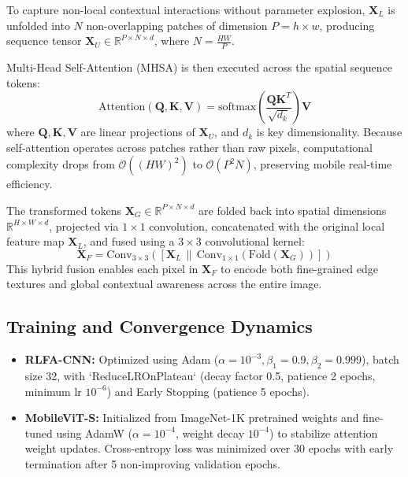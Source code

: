 \documentclass[conference]{IEEEtran}
\begin{document}
To capture non-local contextual interactions without parameter explosion, $\mathbf{X}_L$ is unfolded into $N$ non-overlapping patches of dimension $P = h \times w$, producing sequence tensor $\mathbf{X}_U \in \mathbb{R}^{P \times N \times d}$, where $N = \frac{HW}{P}$.

Multi-Head Self-Attention (MHSA) is then executed across the spatial sequence tokens:
\begin{equation}
\text{Attention}(\mathbf{Q}, \mathbf{K}, \mathbf{V}) = \text{softmax}\left(\frac{\mathbf{Q}\mathbf{K}^T}{\sqrt{d_k}}\right)\mathbf{V}
\end{equation}
where $\mathbf{Q}, \mathbf{K}, \mathbf{V}$ are linear projections of $\mathbf{X}_U$, and $d_k$ is key dimensionality. Because self-attention operates across patches rather than raw pixels, computational complexity drops from $\mathcal{O}((HW)^2)$ to $\mathcal{O}(P^2 N)$, preserving mobile real-time efficiency.

The transformed tokens $\mathbf{X}_G \in \mathbb{R}^{P \times N \times d}$ are folded back into spatial dimensions $\mathbb{R}^{H \times W \times d}$, projected via $1 \times 1$ convolution, concatenated with the original local feature map $\mathbf{X}_L$, and fused using a $3 \times 3$ convolutional kernel:
\begin{equation}
\mathbf{X}_F = \text{Conv}_{3\times3}\left(\left[\mathbf{X}_L \,\|\, \text{Conv}_{1\times1}(\text{Fold}(\mathbf{X}_G))\right]\right)
\end{equation}
This hybrid fusion enables each pixel in $\mathbf{X}_F$ to encode both fine-grained edge textures and global contextual awareness across the entire image.

\subsection{Training and Convergence Dynamics}
\begin{itemize}
    \item \textbf{RLFA-CNN:} Optimized using Adam ($\alpha = 10^{-3}, \beta_1 = 0.9, \beta_2 = 0.999$), batch size 32, with `ReduceLROnPlateau` (decay factor 0.5, patience 2 epochs, minimum lr $10^{-6}$) and Early Stopping (patience 5 epochs).
    \item \textbf{MobileViT-S:} Initialized from ImageNet-1K pretrained weights and fine-tuned using AdamW ($\alpha = 10^{-4}$, weight decay $10^{-4}$) to stabilize attention weight updates. Cross-entropy loss was minimized over 30 epochs with early termination after 5 non-improving validation epochs.
\end{itemize}
\end{document}
